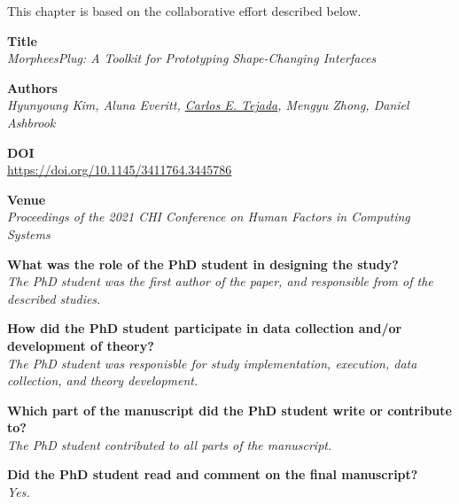   \newpage

  This chapter is based on the collaborative effort described below.

  \vfill

  \noindent
  \textbf{Title}\\
  \textit{MorpheesPlug: A Toolkit for Prototyping Shape-Changing Interfaces}

  \bigskip

  \noindent
  \textbf{Authors}\\
  \textit{Hyunyoung Kim, Aluna Everitt, \underline{Carlos E. Tejada}, Mengyu Zhong, Daniel Ashbrook}

  \bigskip

  \noindent
  \textbf{DOI}\\
  \href{https://doi.org/10.1145/3411764.3445786}{https://doi.org/10.1145/3411764.3445786}

  \bigskip

  \noindent
  \textbf{Venue}\\
  \textit{Proceedings of the 2021 CHI Conference on Human Factors in Computing Systems}


  \bigskip

  \noindent
	\textbf{What was the role of the PhD student in designing the study?}\\
  \textit{The PhD student was the first author of the paper, and responsible
    from of the described studies.}

	\bigskip

	\noindent
	\textbf{How did the PhD student participate in data collection and/or development of theory?}\\
  \textit{The PhD student was responisble for study implementation, execution,
    data collection, and theory development.}

	\bigskip

	\noindent
	\textbf{Which part of the manuscript did the PhD student write or contribute to?}\\
  \textit{The PhD student contributed to all parts of the manuscript.}

	\bigskip

	\noindent
	\textbf{Did the PhD student read and comment on the final manuscript?}\\
	\textit{Yes.}

  \bigskip
  \vfill

  \newpage

